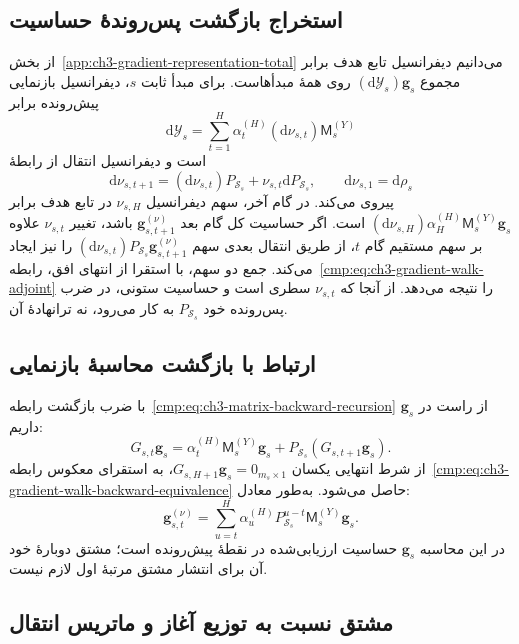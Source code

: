 \subsection{استخراج بازگشت پس‌روندهٔ حساسیت}
\label{app:ch3-gradient-walk-adjoint}

از بخش~\ref{app:ch3-gradient-representation-total}
می‌دانیم دیفرانسیل تابع هدف برابر مجموع
$(\mathrm d\mathscr Y_s)\mathbf g_s$
روی همهٔ مبدأهاست. برای مبدأ ثابت $s$،
دیفرانسیل بازنمایی پیش‌رونده برابر
\[
\mathrm d\mathscr Y_s
=\sum_{t=1}^{H}\alpha_t^{(H)}
(\mathrm d\nu_{s,t})\mathsf M_s^{(Y)}
\]
است و دیفرانسیل انتقال از رابطهٔ
\[
\mathrm d\nu_{s,t+1}
=(\mathrm d\nu_{s,t})P_{\mathcal S_s}
+\nu_{s,t}\mathrm dP_{\mathcal S_s},
\qquad
\mathrm d\nu_{s,1}=\mathrm d\rho_s
\]
پیروی می‌کند. در گام آخر، سهم دیفرانسیل
$\nu_{s,H}$ در تابع هدف برابر
$(\mathrm d\nu_{s,H})\alpha_H^{(H)}
\mathsf M_s^{(Y)}\mathbf g_s$ است.
اگر حساسیت کل گام بعد
$\mathbf g_{s,t+1}^{(\nu)}$ باشد، تغییر
$\nu_{s,t}$ علاوه بر سهم مستقیم گام $t$،
از طریق انتقال بعدی سهم
$(\mathrm d\nu_{s,t})P_{\mathcal S_s}
\mathbf g_{s,t+1}^{(\nu)}$ را نیز ایجاد
می‌کند. جمع دو سهم، با استقرا از انتهای افق،
رابطه~\eqref{cmp:eq:ch3-gradient-walk-adjoint}
را نتیجه می‌دهد.
از آنجا که $\nu_{s,t}$ سطری است و حساسیت
ستونی، در ضرب پس‌رونده خود $P_{\mathcal S_s}$
به کار می‌رود، نه ترانهادهٔ آن.

\subsection{ارتباط با بازگشت محاسبهٔ بازنمایی}
\label{app:ch3-gradient-walk-equivalence}

با ضرب بازگشت
رابطه~\eqref{cmp:eq:ch3-matrix-backward-recursion}
از راست در $\mathbf g_s$ داریم:
\[
G_{s,t}\mathbf g_s
=\alpha_t^{(H)}\mathsf M_s^{(Y)}\mathbf g_s
+P_{\mathcal S_s}(G_{s,t+1}\mathbf g_s).
\]
از شرط انتهایی یکسان
$G_{s,H+1}\mathbf g_s=0_{m_s\times1}$،
به استقرای معکوس
رابطه~\eqref{cmp:eq:ch3-gradient-walk-backward-equivalence}
حاصل می‌شود. به‌طور معادل:
\[
\mathbf g_{s,t}^{(\nu)}
=\sum_{u=t}^{H}\alpha_u^{(H)}
P_{\mathcal S_s}^{u-t}\mathsf M_s^{(Y)}\mathbf g_s.
\]
در این محاسبه $\mathbf g_s$ حساسیت ارزیابی‌شده
در نقطهٔ پیش‌رونده است؛ مشتق دوبارهٔ خود آن
برای انتشار مشتق مرتبهٔ اول لازم نیست.

\subsection{مشتق نسبت به توزیع آغاز و ماتریس انتقال}
\label{app:ch3-gradient-walk-transition}

